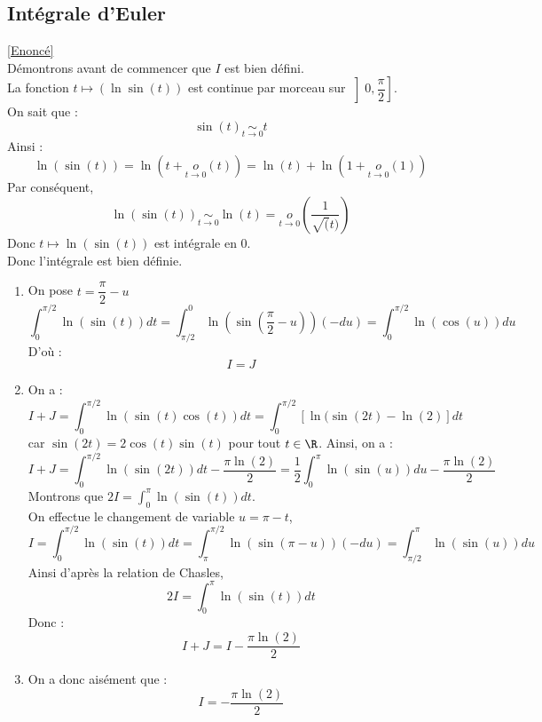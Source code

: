 \documentclass{book}
\begin{document}
	\subsection{Intégrale d'Euler}
	\label{Intégrale d'Euler corrigé}
	\textcolor{blue}{\hyperref[euler_1]{[Enoncé]}}\\
	Démontrons avant de commencer que $I$ est bien défini.\\
	La fonction $t\mapsto(\ln\sin(t))$ est continue par morceau sur $\left]0,\dfrac{\pi}{2}\right]$.\\
	On sait que : \[\sin(t)\underset{t\to 0}{\sim}t\]
	Ainsi : \[\ln(\sin(t))=\ln(t+\underset{t\to 0}{o}(t))=\ln(t)+\ln(1+\underset{t\to 0}{o}(1))\]
	Par conséquent, \[\ln(\sin(t))\underset{t\to 0}{\sim}\ln(t)=\underset{t\to 0}{o}\left(\frac{1}{\sqrt(t)}\right)\]
	Donc $t\mapsto \ln(\sin(t))$ est intégrale en $0$.\\
	Donc l'intégrale est bien définie.
	
	\begin{enumerate}[leftmargin=*]
		\item On pose $t=\dfrac{\pi}{2}-u$
		\[\int_0^{\pi/2}\ln(\sin(t))dt=\int_{\pi/2}^{0}\ln\left(\sin\left(\frac{\pi}{2}-u\right)\right)(-du)=\int_{0}^{\pi/2}\ln(\cos(u))du\]
		D'où : \[I=J\]
		\item On a : \[I+J=\int_{0}^{\pi/2}\ln(\sin(t)\cos(t))dt=\int_{0}^{\pi/2}\left[\ln(\sin(2t)-\ln(2)\right]dt\]
		car $\sin(2t)=2\cos(t)\sin(t)$ pour tout $t\in\R$.
		Ainsi, on a : \[I+J=\int_{0}^{\pi/2}\ln(\sin(2t))dt-\frac{\pi\ln(2)}{2}=\frac{1}{2}\int_{0}^{\pi}\ln(\sin(u))du-\frac{\pi\ln(2)}{2}\]
		Montrons que $\displaystyle 2I=\int_{0}^{\pi}\ln(\sin(t))dt$.\\
		On effectue le changement de variable $u=\pi-t$,
		\[I=\int_{0}^{\pi/2}\ln(\sin(t))dt=\int_{\pi}^{\pi/2}\ln(\sin(\pi-u))(-du)=\int_{\pi/2}^{\pi}\ln(\sin(u))du\]
		Ainsi d'après la relation de Chasles, \[2I=\int_{0}^{\pi}\ln(\sin(t))dt\]
		Donc : \[I+J=I-\frac{\pi\ln(2)}{2}\]
		\item On a donc aisément que : \[I=-\frac{\pi\ln(2)}{2}\]
		\end{enumerate}
	
	
\end{document}

